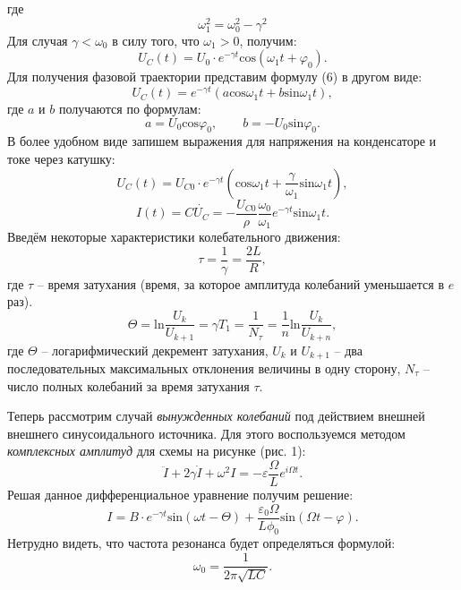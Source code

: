 \documentclass[a4paper,12pt]{extarticle}
\begin{document}
где
\begin{equation}
    \omega_1^2 = \omega_0^2-\gamma^2
\end{equation}
Для случая $\gamma < \omega_0$ в силу того, что $\omega_1 > 0$, получим:
\begin{equation}
    U_C(t) = U_0 \cdot e^{-\gamma t} \text{cos}(\omega_1 t + \varphi_0).
\end{equation}
Для получения фазовой траектории представим формулу (6) в другом виде:
\begin{equation}
    U_C(t) = e^{-\gamma t}(a \text{cos} \omega_1 t + b \text{sin} \omega_1 t),
\end{equation}
где $a$ и $b$ получаются по формулам:
$$a = U_0 \text{cos} \varphi_0, \qquad b = - U_0 \text{sin} \varphi_0.$$
В более удобном виде запишем выражения для напряжения на конденсаторе и токе через катушку:
\begin{equation}
    U_C (t) = U_{C0} \cdot e^{-\gamma t} (\text{cos} \omega_1 t + \frac{\gamma}{\omega_1} \text{sin} \omega_1 t),
\end{equation}
\begin{equation}
    I(t) = C\dot{U_C}= - \frac{U_{C0}}{\rho} \frac{\omega_0}{\omega_1} e^{-\gamma t} \text{sin} \omega_1 t.
\end{equation}
Введём некоторые характеристики колебательного движения:
\begin{equation}
    \tau = \frac{1}{\gamma} = \frac{2L}{R},
\end{equation}
где $\tau$ -- время затухания (время, за которое амплитуда колебаний уменьшается в $e$ раз).
\begin{equation}
    \Theta = \text{ln} \frac{U_k}{U_{k+1}} = \gamma T_1 = \frac{1}{N_\tau} = \frac{1}{n} \text{ln} \frac{U_k}{U_{k+n}},
\end{equation}
где $\Theta$ -- логарифмический декремент затухания, $U_k$ и $U_{k+1}$ -- два последовательных максимальных отклонения величины в одну сторону, $N_\tau$ -- число полных колебаний за время затухания $\tau$.

Теперь рассмотрим случай \textit{вынужденных колебаний} под действием внешней внешнего синусоидального источника. Для этого воспользуемся методом \textit{комплексных амплитуд} для схемы на рисунке (рис. 1):
\begin{equation}
    \ddot{I} + 2 \gamma \dot{I} + \omega^2 I = - \varepsilon \frac{\Omega}{L} e^{i\Omega t}.
\end{equation}
Решая данное дифференциальное уравнение получим решение:
\begin{equation}
    I = B\cdot e^{-\gamma t} \text{sin}(\omega t - \Theta) + \frac{\varepsilon_0 \Omega}{L \phi_0} \text{sin} (\Omega t - \varphi).
\end{equation}
Нетрудно видеть, что частота резонанса будет определяться формулой:
\begin{equation}
    \omega_0 = \frac{1}{2 \pi \sqrt{LC}}.
\end{equation}
\end{document}
